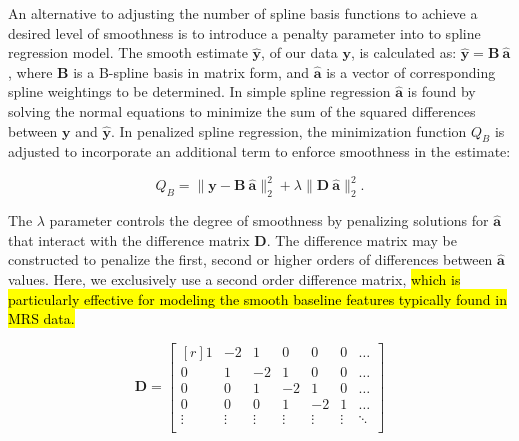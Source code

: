 \documentclass[num-refs]{wiley-article}
\newcommand{\revone}[2]{\hl{#1}\marginnote{\hl{#2}}}
\begin{document}
An alternative to adjusting the number of spline basis functions to achieve a desired level of smoothness is to introduce a penalty parameter into to spline regression model. The smooth estimate $\hat{\mathbf{y}}$, of our data $\mathbf{y}$, is calculated as: $\hat{\mathbf{y}} = \mathbf{B} \ \hat{\mathbf{a}}$, where $\mathbf{B}$ is a B-spline basis in matrix form, and $\hat{\mathbf{a}}$ is a vector of corresponding spline weightings to be determined. In simple spline regression $\hat{\mathbf{a}}$ is found by solving the normal equations to minimize the sum of the squared differences between $\mathbf{y}$ and $\hat{\mathbf{y}}$. In penalized spline regression, the minimization function $Q_B$ is adjusted to incorporate an additional term to enforce smoothness in the estimate:

\begin{equation}
  Q_{B} = \|\mathbf{y} - \mathbf{B} \ \hat{\mathbf{a}} \|^{2}_{2} + \lambda \|\mathbf{D} \ \hat{\mathbf{a}}\|^{2}_{2}.
  \label{qb}
\end{equation}

The $\lambda$ parameter controls the degree of smoothness by penalizing solutions for $\hat{\mathbf{a}}$ that interact with the difference matrix $\mathbf{D}$. The difference matrix may be constructed to penalize the first, second or higher orders of differences between $\hat{\mathbf{a}}$ values. Here, we exclusively use a second order difference matrix, \revone{which is particularly effective for modeling the smooth baseline features typically found in MRS data.}{R1.6}

\begin{equation}
  \mathbf{D} =
  \begin{bmatrix*}[r]
    1 & -2 &  1 &  0 &  0 &  0 & \dots \\
    0 &  1 & -2 &  1 &  0 &  0 & \dots \\
    0 &  0 &  1 & -2 &  1 &  0 & \dots \\
    0 &  0 &  0 &  1 & -2 &  1 & \dots \\
    \vdots & \vdots & \vdots & \vdots & \vdots & \vdots & \ddots \\
  \end{bmatrix*}
  \label{d_mat}
\end{equation}
\end{document}
